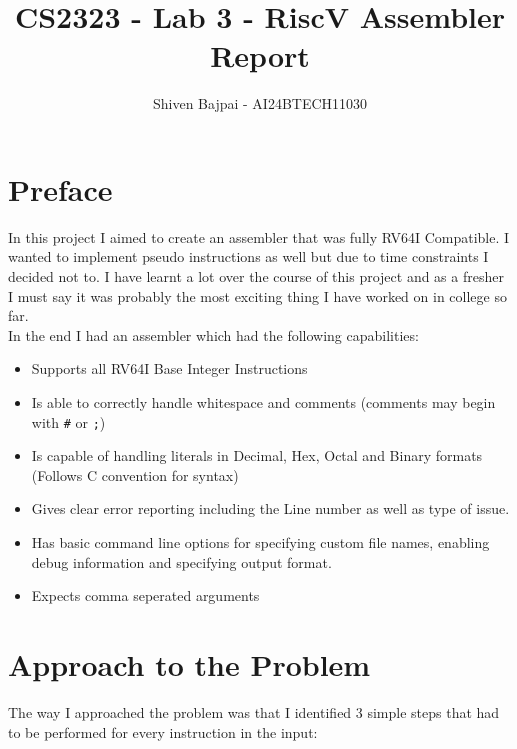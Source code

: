 \documentclass[12pt]{article}
\begin{document}
	
	\vspace{3cm}

	\title{CS2323 - Lab 3 - RiscV Assembler Report}
	\author{Shiven Bajpai - AI24BTECH11030}

	\maketitle
	\bigskip    	

	\renewcommand{\thefigure}{\theenumi}
	\renewcommand{\thetable}{\theenumi}

	\tableofcontents
	\newpage

    \section{Preface}
    In this project I aimed to create an assembler that was fully RV64I Compatible. I wanted to implement pseudo instructions as well but due to time constraints I decided not to. I have learnt a lot over the course of this project and as a fresher I must say it was probably the most exciting thing I have worked on in college so far.
    \\

    In the end I had an assembler which had the following capabilities:
    \begin{itemize}
        \item Supports all RV64I Base Integer Instructions
        \item Is able to correctly handle whitespace and comments (comments may begin with \verb|#| or \verb|;|)
        \item Is capable of handling literals in Decimal, Hex, Octal and Binary formats (Follows C convention for syntax)
        \item Gives clear error reporting including the Line number as well as type of issue.
        \item Has basic command line options for specifying custom file names, enabling debug information and specifying output format.
        \item Expects comma seperated arguments
    \end{itemize}

    \section{Approach to the Problem}

    The way I approached the problem was that I identified 3 simple steps that had to be performed for every instruction in the input:
\end{document}
